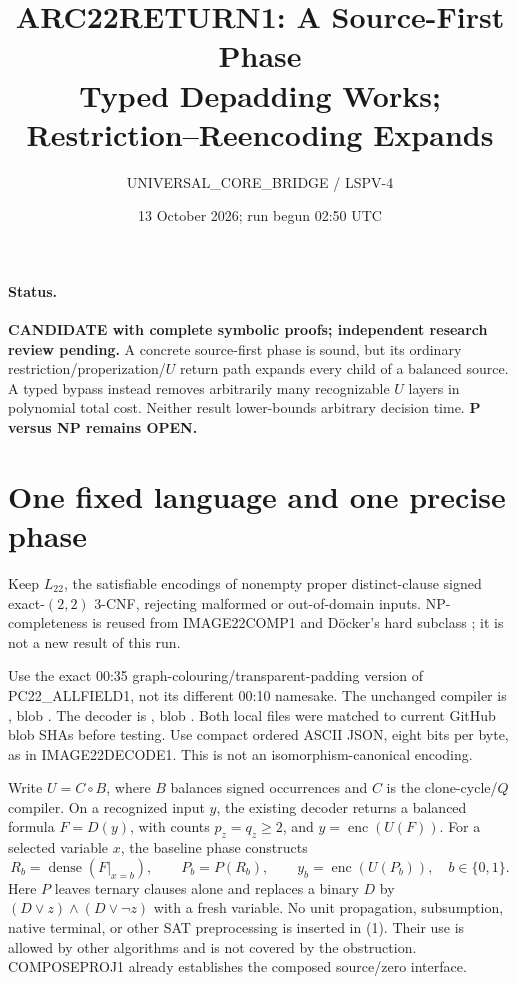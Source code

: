\documentclass[11pt]{article}
\title{ARC22RETURN1: A Source-First Phase\\\large Typed Depadding Works; Restriction--Reencoding Expands}
\author{UNIVERSAL\_CORE\_BRIDGE / LSPV-4}
\date{13 October 2026; run begun 02:50 UTC}
\newcommand{\enc}{\operatorname{enc}}
\begin{document}
\maketitle
\paragraph{Status.}
\textbf{CANDIDATE with complete symbolic proofs; independent research review pending.}
A concrete source-first phase is sound, but its ordinary restriction/properization/$U$
return path expands every child of a balanced source. A typed bypass instead
removes arbitrarily many recognizable $U$ layers in polynomial total cost.
Neither result lower-bounds arbitrary decision time. \textbf{P versus NP remains OPEN.}

\section{One fixed language and one precise phase}
Keep $L_{22}$, the satisfiable encodings of nonempty proper distinct-clause
signed exact-$(2,2)$ 3-CNF, rejecting malformed or out-of-domain inputs.
NP-completeness is reused from IMAGE22COMP1 and D\"ocker's hard subclass
\cite{docker}; it is not a new result of this run.

Use the exact 00:35 graph-colouring/transparent-padding version of
PC22\_ALLFIELD1, not its different 00:10 namesake. The unchanged compiler is
, blob
.
The decoder is , blob
.
Both local files were matched to current GitHub blob SHAs before testing.
Use compact ordered ASCII JSON, eight bits per byte, as in IMAGE22DECODE1.
This is not an isomorphism-canonical encoding.

Write $U=C\circ B$, where $B$ balances signed occurrences and $C$ is the
clone-cycle/$Q$ compiler. On a recognized input $y$, the existing decoder
returns a balanced formula $F=D(y)$, with counts $p_z=q_z\ge2$, and
$y=\enc(U(F))$. For a selected variable $x$, the baseline phase constructs
\[
 R_b=\operatorname{dense}(F|_{x=b}),\qquad
 P_b=P(R_b),\qquad y_b=\enc(U(P_b)),\quad b\in\{0,1\}.       \tag{1}
\]
Here $P$ leaves ternary clauses alone and replaces a binary $D$ by
$(D\lor z)\land(D\lor\neg z)$ with a fresh variable. No unit propagation,
subsumption, native terminal, or other SAT preprocessing is inserted in (1).
Their use is allowed by other algorithms and is not covered by the obstruction.
COMPOSEPROJ1 already establishes the composed source/zero interface.
\end{document}
